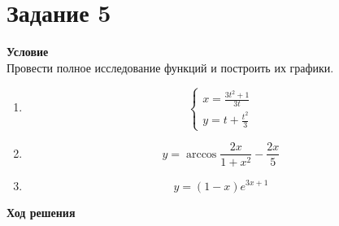 \newpage
\section{Задание 5} 
{\bf\large Условие} \\
Провести полное исследование функций и построить их графики.
\begin{enumerate}
    \item 
    \begin{equation*}
        \begin{cases}
            x = \frac{3t^2 +1}{3t} \\
            y = t + \frac{t^2}{3}
        \end{cases}
    \end{equation*}
    \item 
    \[
        y = \arccos{\frac{2x}{1+x^2}} - \frac{2x}{5}
    \]
    \item 
    \[
        y = (1-x)e^{3x+1}
    \]
\end{enumerate}
{\bf\large Ход решения} \\
